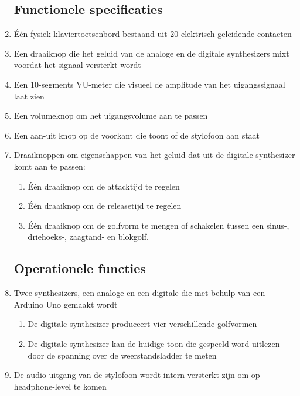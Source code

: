\documentclass[12pt, a4paper, dutch]{article}
\begin{document}
\begin{enumerate}
\subsection{Functionele specificaties}
	\item \label{req:20keys} \'E\'en fysiek klaviertoetsenbord bestaand uit 20
		elektrisch geleidende contacten
	\item \label{req:mixfader} Een draaiknop die het geluid van de analoge en de
		digitale synthesizers mixt voordat het signaal versterkt wordt
	\item \label{req:vumeter} Een 10-segments VU-meter die visueel de amplitude van het
		uigangssignaal laat zien
	\item \label{req:volknob} Een volumeknop om het uigangsvolume aan te passen
	\item \label{req:powerbutton} Een aan-uit knop op de voorkant die toont of de stylofoon
		aan staat
	\item \label{req:digsoundtweak} Draaiknoppen om eigenschappen van het geluid dat
		uit de digitale synthesizer komt aan te passen:
	\begin{enumerate}
		\item \label{req:attack} \'E\'en draaiknop om de attacktijd te regelen
		\item \label{req:release} \'E\'en draaiknop om de releasetijd te regelen
		\item \label{req:wavform} \'E\'en draaiknop om de golfvorm te mengen of schakelen
			tussen een sinus-, driehoeks-, zaagtand- en blokgolf.
	\end{enumerate}
\subsection{Operationele functies}
	\item \label{req:engines} Twee synthesizers, een analoge en een digitale die met
		behulp van een Arduino Uno gemaakt wordt
	\begin{enumerate}
		\item \label{req:wavforms} De digitale synthesizer produceert vier verschillende
			golfvormen
		\item \label{req:readtone} De digitale synthesizer kan de huidige toon die
			gespeeld word uitlezen door de spanning over de weerstandsladder te meten
	\end{enumerate}
	\item \label{req:phonesout} De audio uitgang van de stylofoon wordt intern
		versterkt zijn om op headphone-level te komen

\end{enumerate}
\end{document}
